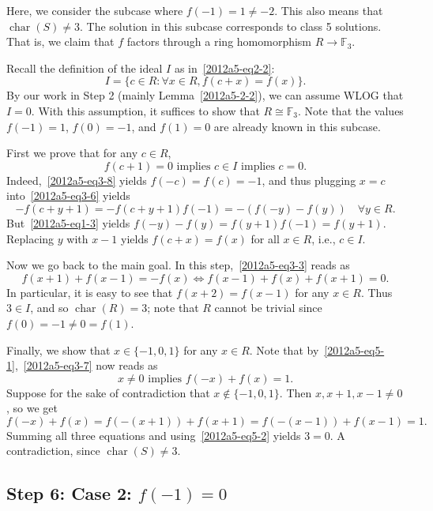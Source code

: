 \documentclass{article}
\newcommand{\F}{\mathbb{F}}
\DeclareMathOperator{\rchar}{char}
\begin{document}
Here, we consider the subcase where $f(-1) = 1 \neq -2$.
This also means that $\rchar(S) \neq 3$.
The solution in this subcase corresponds to class 5 solutions.
That is, we claim that $f$ factors through a ring homomorphism $R \to \F_3$.

Recall the definition of the ideal $I$ as in~\eqref{2012a5-eq2-2}:
\[ I = \{c \in R : \forall x \in R, f(c + x) = f(x)\}. \]
By our work in Step 2 (mainly Lemma~\ref{2012a5-2-2}), we can assume WLOG that $I = 0$.
With this assumption, it suffices to show that $R \cong \F_3$.
Note that the values $f(-1) = 1$, $f(0) = -1$, and $f(1) = 0$ are already known in this subcase.

First we prove that for any $c \in R$,
\[ f(c + 1) = 0 \text{ implies } c \in I \text{ implies } c = 0. \tag{5.1}\label{2012a5-eq5-1} \]
Indeed,~\eqref{2012a5-eq3-8} yields $f(-c) = f(c) = -1$, and thus plugging $x = c$ into~\eqref{2012a5-eq3-6} yields
\[ -f(c + y + 1) = -f(c + y + 1) f(-1) = -(f(-y) - f(y)) \quad \forall y \in R. \]
But~\eqref{2012a5-eq1-3} yields $f(-y) - f(y) = f(y + 1) f(-1) = f(y + 1)$.
Replacing $y$ with $x - 1$ yields $f(c + x) = f(x)$ for all $x \in R$, i.e., $c \in I$.

Now we go back to the main goal.
In this step,~\eqref{2012a5-eq3-3} reads as
\[ f(x + 1) + f(x - 1) = -f(x) \iff f(x - 1) + f(x) + f(x + 1) = 0. \tag{5.2}\label{2012a5-eq5-2} \]
In particular, it is easy to see that $f(x + 2) = f(x - 1)$ for any $x \in R$.
Thus $3 \in I$, and so $\rchar(R) = 3$; note that $R$ cannot be trivial since $f(0) = -1 \neq 0 = f(1)$.

Finally, we show that $x \in \{-1, 0, 1\}$ for any $x \in R$.
Note that by~\eqref{2012a5-eq5-1},~\eqref{2012a5-eq3-7} now reads as
\[ x \neq 0 \text{ implies } f(-x) + f(x) = 1. \tag{5.3}\label{2012a5-eq5-3} \]
Suppose for the sake of contradiction that $x \notin \{-1, 0, 1\}$.
Then $x, x + 1, x - 1 \neq 0$, so we get
\[ f(-x) + f(x) = f(-(x + 1)) + f(x + 1) = f(-(x - 1)) + f(x - 1) = 1. \]
Summing all three equations and using~\eqref{2012a5-eq5-2} yields $3 = 0$.
A contradiction, since $\rchar(S) \neq 3$.









\subsection*{Step 6: Case 2: $f(-1) = 0$}
\end{document}
